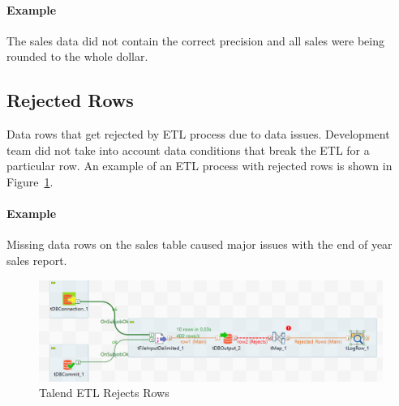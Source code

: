 \paragraph*{Example} The sales data did not contain the correct precision and all sales were being rounded to the whole dollar.

\subsection*{Rejected Rows}

Data rows that get rejected by ETL process due to data issues.
Development team did not take into account data conditions that break the ETL for a particular row.
An example of an ETL process with rejected rows is shown in Figure~\ref{fig:rejected-rows}.

\paragraph*{Example} Missing data rows on the sales table caused major issues with the end of year sales report.

\begin{figure}[htb]
    \centering
    \includegraphics[width=.8\textwidth]{figures/rejected-rows.png}
    \caption{Talend ETL Rejects Rows}
    \label{fig:rejected-rows}
\end{figure}
\FloatBarrier






